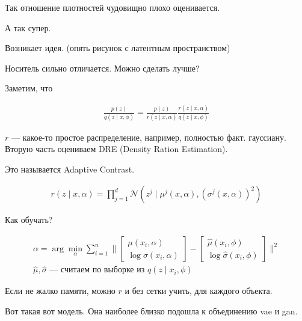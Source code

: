 \documentclass{book}
\begin{document}
Так отношение плотностей чудовищно плохо оценивается.


А так супер.

Возникает идея. (опять рисунок с латентным пространством)

Носитель сильно отличается. Можно сделать лучше?

Заметим, что

\begin{gather*}
  \frac{p(z)}{q(z\mid x,\phi)}=\frac{p(z)}{r(z\mid x, \alpha)}\frac{r(z\mid x, \alpha)}{q(z\mid x, \phi)}
\end{gather*}

$r$ --- какое-то простое распределение, например, полностью факт. гауссиану. Вторую часть оцениваем DRE (Density Ration Estimation).

Это называется Adaptive Contrast.

\begin{gather*}
  r(z\mid x, \alpha)=\prod_{j=1}^{d} {\mathcal{N}\left(z^j\mid \mu^j(x,\alpha),\left(\sigma^j(x,\alpha)\right)^2\right)}
\end{gather*}

Как обучать?

\begin{gather*}
  \alpha = \arg\min_\alpha \sum_{i=1}^{n} {\Bigg\|}\begin{bmatrix}\mu(x_i,\alpha)\\\log\sigma(x_i,\alpha)\end{bmatrix}-\begin{bmatrix}\hat{\mu}(x_i, \phi)\\\log \hat{\sigma}(x_i,\phi)\end{bmatrix}{\Bigg\|}^2\\
  \hat{\mu}, \hat{\sigma} \textrm{ --- считаем по выборке из }q(z\mid x_i, \phi)
\end{gather*}

Если не жалко памяти, можно $r$ и без сетки учить, для каждого объекта.

Вот такая вот модель. Она наиболее близко подошла к объединению vae и gan.
\end{document}

